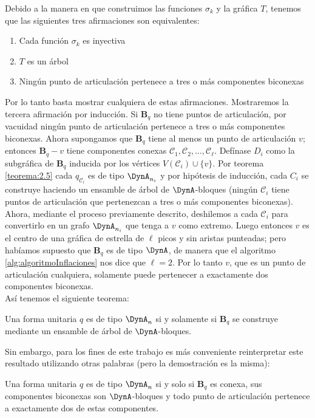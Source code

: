Debido a la manera en que construimos las funciones $\sigma_{k}$ y la gráfica $T$, tenemos que las siguientes tres afirmaciones son equivalentes:\\
\begin{enumerate}
\item Cada función $\sigma_{k}$ es inyectiva
\item $T$ es un árbol
\item Ningún punto de articulación pertenece a tres o más componentes biconexas
\end{enumerate}
Por lo tanto basta mostrar cualquiera de estas afirmaciones. Mostraremos la tercera afirmación por inducción. Si $\textbf{B}_{q}$ no tiene puntos de articulación, por vacuidad ningún punto de articulación pertenece a tres o más componentes biconexas. Ahora supongamos que $\textbf{B}_{q}$ tiene al menos un punto de articulación $v$; entonces $\textbf{B}_{q} - v$ tiene componentes conexas $\mathcal{C}_{1}, \mathcal{C}_{2}, \ldots, \mathcal{C}_{\ell}$. Defínase $D_{i}$ como la subgráfica de $\textbf{B}_{q}$ inducida por los vértices $V\left(\mathcal{C}_{i}\right) \cup \{v\}$. Por teorema \ref{teorema:2.5} cada $q_{\mathcal{C}_{i}}$ es de tipo $\DynA_{n_{i}}$ y por hipótesis de inducción, cada $C_{i}$ se construye haciendo un ensamble de árbol de $\DynA$-bloques (ningún $\mathcal{C}_{i}$ tiene puntos de articulación que pertenezcan a tres o más componentes biconexas). Ahora, mediante el proceso previamente descrito, deshilemos a cada $\mathcal{C}_{i}$ para convertirlo en un grafo $\DynA_{n_{i}}$ que tenga a $v$ como extremo. Luego entonces $v$ es el centro de una gráfica de estrella de $\ell$ picos y sin aristas punteadas; pero habíamos supuesto que $\textbf{B}_{q}$ es de tipo $\DynA$, de manera que el algoritmo \ref{alg:algoritmoInflaciones} nos dice que $\ell = 2$. Por lo tanto $v$, que es un punto de articulación cualquiera, solamente puede pertenecer a exactamente dos componentes biconexas.\\

\newpage
Así tenemos el siguiente teorema:
\begin{theorem}
Una forma unitaria $q$ es de tipo $\DynA_{n}$ si y solamente si $\textbf{B}_{q}$ se construye mediante un ensamble de árbol de $\DynA$-bloques.
\label{teorema:2.12}
\end{theorem}
Sin embargo, para los fines de este trabajo es más conveniente reinterpretar este resultado utilizando otras palabras (pero la demostración es la misma):
\begin{corollary}
Una forma unitaria $q$ es de tipo $\DynA_{n}$ si y solo si $\textbf{B}_{q}$ es conexa, sus componentes biconexas son $\DynA$-bloques y todo punto de articulación pertenece a exactamente dos de estas componentes.
\label{corolario:2.13}
\end{corollary}